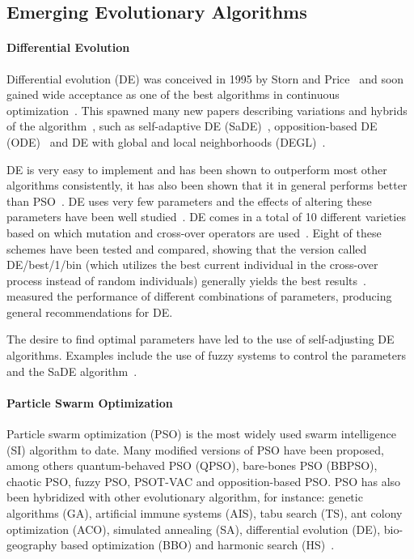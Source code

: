 \subsection{Emerging Evolutionary Algorithms}

\paragraph{Differential Evolution}

Differential evolution (DE) was conceived in 1995 by Storn and Price~\cite{storn1995differential} and soon gained wide acceptance as one of the best algorithms in continuous optimization~\cite{price1997differential}. This spawned many new papers describing variations and hybrids of the algorithm~\cite{5601760}, such as self-adaptive DE (SaDE)~\cite{qin2009differential}, opposition-based DE (ODE)~\cite{rahnamayan2008opposition} and DE with global and local neighborhoods (DEGL)~\cite{rahnamayan2008opposition}.

DE is very easy to implement and has been shown to outperform most other algorithms consistently, it has also been shown that it in general performs better than PSO~\cite{das2009differential, vesterstrom2004comparative}. DE uses very few parameters and the effects of altering these parameters have been well studied~\cite{5601760}. DE comes in a total of 10 different varieties based on which mutation and cross-over operators are used~\cite{price2006differential}. Eight of these schemes have been tested and compared, showing that the version called DE/best/1/bin (which utilizes the best current individual in the cross-over process instead of random individuals) generally yields the best results~\cite{mezura2006comparative}.~\cite{gamperle2002parameter} measured the performance of different combinations of parameters, producing general recommendations for DE.

The desire to find optimal parameters have led to the use of self-adjusting DE algorithms. Examples include the use of fuzzy systems to control the parameters~\cite{liu2005fuzzy} and the SaDE algorithm~\cite{qin2009differential}.

\paragraph{Particle Swarm Optimization}

Particle swarm optimization (PSO) is the most widely used swarm intelligence (SI) algorithm to date. Many modified versions of PSO have been proposed, among others quantum-behaved PSO (QPSO), bare-bones PSO (BBPSO), chaotic PSO, fuzzy PSO, PSOT-VAC and opposition-based PSO. PSO has also been hybridized with other evolutionary algorithm, for instance: genetic algorithms (GA), artificial immune systems (AIS), tabu search (TS), ant colony optimization (ACO), simulated annealing (SA), differential evolution (DE), bio-geography based optimization (BBO) and harmonic search (HS)~\cite{zhang2015comprehensive}.

